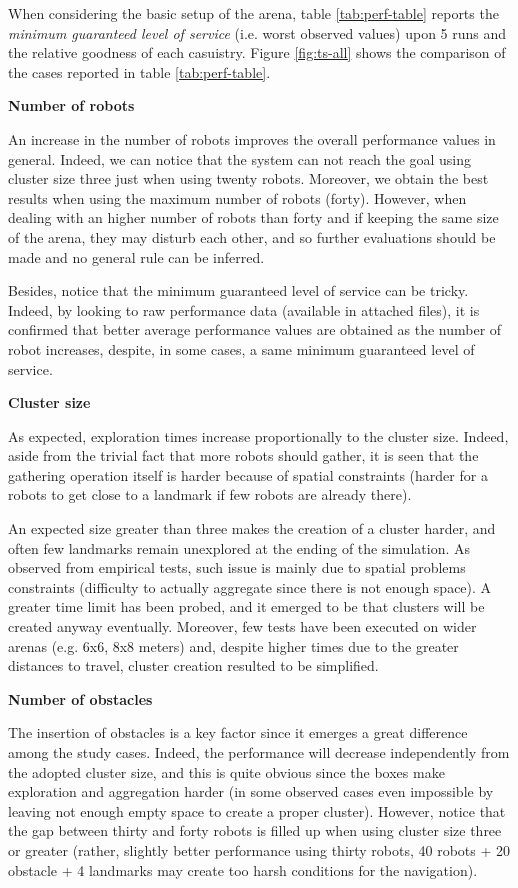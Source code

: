 When considering the basic setup of the arena, table \ref{tab:perf-table} reports the \textit{minimum guaranteed level of service} (i.e. worst observed values) upon 5 runs and the relative goodness of each casuistry. Figure \ref{fig:ts-all} shows the comparison of the cases reported in table \ref{tab:perf-table}.

\bigskip
\noindent
\textbf{Number of robots}

An increase in the number of robots improves the overall performance values in general. 
Indeed, we can notice that the system can not reach the goal using cluster size three just when using twenty robots. Moreover, we obtain the best results when using the maximum number of robots (forty).
However, when dealing with an higher number of robots than forty and if keeping the same size of the arena, they may disturb each other, and so further evaluations should be made and no general rule can be inferred. 

Besides, notice that the minimum guaranteed level of service can be tricky. Indeed, by looking to raw performance data (available in attached files), it is confirmed that better average performance values are obtained as the number of robot increases, despite, in some cases, a same minimum guaranteed level of service.

\bigskip
\noindent
\textbf{Cluster size}

As expected, exploration times increase proportionally to the cluster size. Indeed, aside from the trivial fact that more robots should gather, it is seen that the gathering operation itself is harder because of spatial constraints (harder for a robots to get close to a landmark if few robots are already there).

\noindent
An expected size greater than three makes the creation of a cluster harder, and often few landmarks remain unexplored at the ending of the simulation. As observed from empirical tests, such issue is mainly due to spatial problems constraints (difficulty to actually aggregate since there is not enough space). A greater time limit has been probed, and it emerged to be that clusters will be created anyway eventually. Moreover, few tests have been executed on wider arenas (e.g. 6x6, 8x8 meters) and, despite higher times due to the greater distances to travel, cluster creation resulted to be simplified.

\bigskip
\noindent
\textbf{Number of obstacles}

The insertion of obstacles is a key factor since it emerges a great difference among the study cases. Indeed, the performance will decrease independently from the adopted cluster size, and this is quite obvious since the boxes make exploration and aggregation harder (in some observed cases even impossible by leaving not enough empty space to create a proper cluster). However, notice that the gap between thirty and forty robots is filled up when using cluster size three or greater (rather, slightly better performance using thirty robots, 40 robots + 20 obstacle + 4 landmarks may create too harsh conditions for the navigation).

